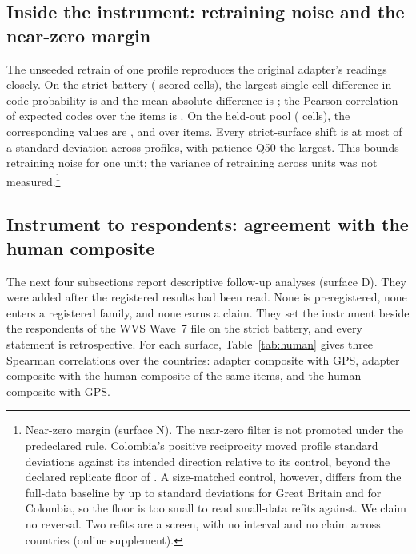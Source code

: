 \subsection{Inside the instrument: retraining noise and the near-zero margin}\label{sec:res-noise}

The unseeded retrain of one profile reproduces the original adapter's readings closely. On the strict battery ( scored cells), the largest single-cell difference in code probability is  and the mean absolute difference is ; the Pearson correlation of expected codes over the  items is . On the held-out pool ( cells), the corresponding values are ,  and  over  items. Every strict-surface shift is at most  of a standard deviation across profiles, with patience Q50 the largest. This bounds retraining noise for one unit; the variance of retraining across units was not measured.\footnote{Near-zero margin (surface N). The near-zero filter is not promoted under the predeclared rule. Colombia's positive reciprocity moved  profile standard deviations against its intended direction relative to its control, beyond the declared replicate floor of . A size-matched control, however, differs from the full-data baseline by up to  standard deviations for Great Britain and  for Colombia, so the floor is too small to read small-data refits against. We claim no reversal. Two refits are a screen, with no interval and no claim across countries (online supplement).}

\subsection{Instrument to respondents: agreement with the human composite}\label{sec:res-human}

The next four subsections report descriptive follow-up analyses (surface D). They were added after the registered results had been read. None is preregistered, none enters a registered family, and none earns a claim. They set the instrument beside the respondents of the WVS Wave~7 file on the strict battery, and every statement is retrospective. For each surface, Table~\ref{tab:human} gives three Spearman correlations over the  countries: adapter composite with GPS, adapter composite with the human composite of the same items, and the human composite with GPS.

